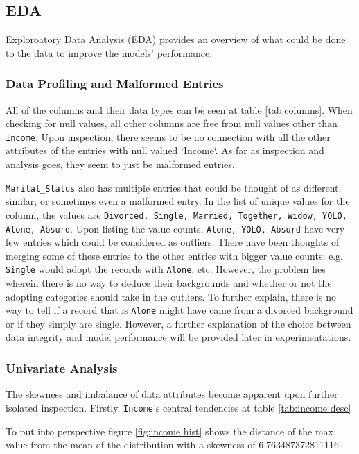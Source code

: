 \subsection{EDA}

Exploroatory Data Analysis (EDA) provides an overview of what could be done to the data to improve the models' performance. 

\subsubsection{Data Profiling and Malformed Entries}

All of the columns and their data types can be seen at table \ref{tab:columns}. When checking for null values, all other columns are free from null values other than \texttt{Income}. Upon inspection, there seems to be no connection with all the other attributes of the entries with null valued `Income`. As far as inspection and analysis goes, they seem to just be malformed entries. 

\texttt{Marital\_Status} also has multiple entries that could be thought of as different, similar, or sometimes even a malformed entry. In the list of unique values for the column, the values are \texttt{Divorced, Single, Married, Together, Widow, YOLO, Alone, Absurd}. Upon listing the value counts, \texttt{Alone, YOLO, Absurd} have very few entries which could be considered as outliers. There have been thoughts of merging some of these entries to the other entries with bigger value counts; e.g. \texttt{Single} would adopt the records with \texttt{Alone}, etc. However, the problem lies wherein there is no way to deduce their backgrounds and whether or not the adopting categories should take in the outliers. To further explain, there is no way to tell if a record that is \texttt{Alone} might have came from a divorced background or if they simply are single. However, a further explanation of the choice between data integrity and model performance will be provided later in experimentations.

\subsubsection{Univariate Analysis}

The skewness and imbalance of data attributes become apparent upon further isolated inspection. Firstly, \texttt{Income}'s central tendencies at table \ref{tab:income desc}

To put into perspective figure \ref{fig:income hist} shows the distance of the max value from the mean of the distribution with a skewness of 6.763487372811116

